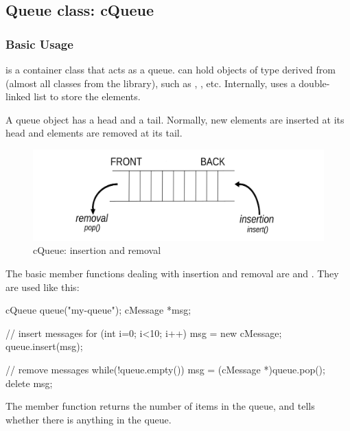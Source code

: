\subsection{Queue class: cQueue}

\subsubsection{Basic Usage}


 is a container class that acts as a queue.
 can hold objects of type derived from 
(almost all classes from the {\opp} library), such as
, , etc. Internally, 
uses a double-linked list to store the elements.

A queue object has a head and a tail. Normally, new elements
are inserted at its head and elements are removed at its tail.


\begin{figure}[htbp]
  \begin{center}
    \includegraphics{figures/simlib-queue}
    \caption{cQueue: insertion and removal}
    \label{fig:ch-sim-lib:cqueue}
  \end{center}
\end{figure}

The basic  member functions dealing with insertion and removal
are  and . They are used
like this:

\begin{cpp}
cQueue queue("my-queue");
cMessage *msg;

// insert messages
for (int i=0; i<10; i++)
{
  msg = new cMessage;
  queue.insert(msg);
}

// remove messages
while(!queue.empty())
{
  msg = (cMessage *)queue.pop();
  delete msg;
}
\end{cpp}


The  member function returns the number of items in the
queue, and  tells whether there is anything in the queue.

